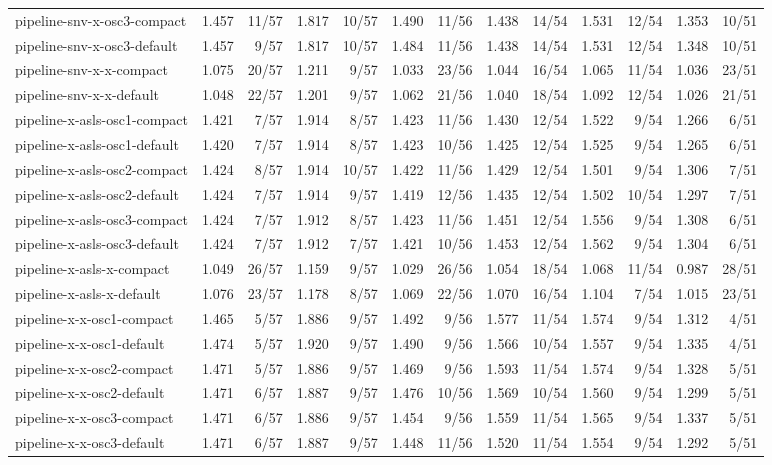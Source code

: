 \begin{tabular}{lrrrrrrrrrrrr}
pipeline-snv-x-osc3-compact & 1.457 & 11/57 & 1.817 & 10/57 & 1.490 & 11/56 & 1.438 & 14/54 & 1.531 & 12/54 & 1.353 & 10/51 \\
pipeline-snv-x-osc3-default & 1.457 & 9/57 & 1.817 & 10/57 & 1.484 & 11/56 & 1.438 & 14/54 & 1.531 & 12/54 & 1.348 & 10/51 \\
pipeline-snv-x-x-compact & 1.075 & 20/57 & 1.211 & 9/57 & 1.033 & 23/56 & 1.044 & 16/54 & 1.065 & 11/54 & 1.036 & 23/51 \\
pipeline-snv-x-x-default & 1.048 & 22/57 & 1.201 & 9/57 & 1.062 & 21/56 & 1.040 & 18/54 & 1.092 & 12/54 & 1.026 & 21/51 \\
pipeline-x-asls-osc1-compact & 1.421 & 7/57 & 1.914 & 8/57 & 1.423 & 11/56 & 1.430 & 12/54 & 1.522 & 9/54 & 1.266 & 6/51 \\
pipeline-x-asls-osc1-default & 1.420 & 7/57 & 1.914 & 8/57 & 1.423 & 10/56 & 1.425 & 12/54 & 1.525 & 9/54 & 1.265 & 6/51 \\
pipeline-x-asls-osc2-compact & 1.424 & 8/57 & 1.914 & 10/57 & 1.422 & 11/56 & 1.429 & 12/54 & 1.501 & 9/54 & 1.306 & 7/51 \\
pipeline-x-asls-osc2-default & 1.424 & 7/57 & 1.914 & 9/57 & 1.419 & 12/56 & 1.435 & 12/54 & 1.502 & 10/54 & 1.297 & 7/51 \\
pipeline-x-asls-osc3-compact & 1.424 & 7/57 & 1.912 & 8/57 & 1.423 & 11/56 & 1.451 & 12/54 & 1.556 & 9/54 & 1.308 & 6/51 \\
pipeline-x-asls-osc3-default & 1.424 & 7/57 & 1.912 & 7/57 & 1.421 & 10/56 & 1.453 & 12/54 & 1.562 & 9/54 & 1.304 & 6/51 \\
pipeline-x-asls-x-compact & 1.049 & 26/57 & 1.159 & 9/57 & 1.029 & 26/56 & 1.054 & 18/54 & 1.068 & 11/54 & 0.987 & 28/51 \\
pipeline-x-asls-x-default & 1.076 & 23/57 & 1.178 & 8/57 & 1.069 & 22/56 & 1.070 & 16/54 & 1.104 & 7/54 & 1.015 & 23/51 \\
pipeline-x-x-osc1-compact & 1.465 & 5/57 & 1.886 & 9/57 & 1.492 & 9/56 & 1.577 & 11/54 & 1.574 & 9/54 & 1.312 & 4/51 \\
pipeline-x-x-osc1-default & 1.474 & 5/57 & 1.920 & 9/57 & 1.490 & 9/56 & 1.566 & 10/54 & 1.557 & 9/54 & 1.335 & 4/51 \\
pipeline-x-x-osc2-compact & 1.471 & 5/57 & 1.886 & 9/57 & 1.469 & 9/56 & 1.593 & 11/54 & 1.574 & 9/54 & 1.328 & 5/51 \\
pipeline-x-x-osc2-default & 1.471 & 6/57 & 1.887 & 9/57 & 1.476 & 10/56 & 1.569 & 10/54 & 1.560 & 9/54 & 1.299 & 5/51 \\
pipeline-x-x-osc3-compact & 1.471 & 6/57 & 1.886 & 9/57 & 1.454 & 9/56 & 1.559 & 11/54 & 1.565 & 9/54 & 1.337 & 5/51 \\
pipeline-x-x-osc3-default & 1.471 & 6/57 & 1.887 & 9/57 & 1.448 & 11/56 & 1.520 & 11/54 & 1.554 & 9/54 & 1.292 & 5/51 \\
\bottomrule
\end{tabular}
